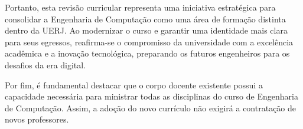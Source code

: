 Portanto, esta revisão curricular representa uma iniciativa estratégica para consolidar a Engenharia de Computação como uma área de formação distinta dentro da UERJ. Ao modernizar o curso e garantir uma identidade mais clara para seus egressos, reafirma-se o compromisso da universidade com a excelência acadêmica e a inovação tecnológica, preparando os futuros engenheiros para os desafios da era digital.

Por fim, é fundamental destacar que o corpo docente existente possui a capacidade necessária para ministrar todas as disciplinas do curso de Engenharia de Computação. Assim, a adoção do novo currículo não exigirá a contratação de novos professores.

